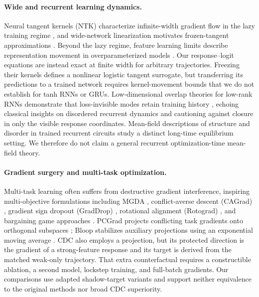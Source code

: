 \documentclass{article}
\theoremstyle{definition}
\theoremstyle{remark}
\begin{document}
\paragraph{Wide and recurrent learning dynamics.}
Neural tangent kernels (NTK) characterize infinite-width gradient flow in the lazy training regime \citep{jacot2018ntk,du2019gradient,arora2019exact,chizat2019lazy}, and wide-network linearization motivates frozen-tangent approximations \citep{lee2019wide}. Beyond the lazy regime, feature learning limits describe representation movement in overparameterized models \citep{yang2021tensor,bordelon2022learning}. Our response--logit equations are instead exact at finite width for arbitrary trajectories. Freezing their kernels defines a nonlinear logistic tangent surrogate, but transferring its predictions to a trained network requires kernel-movement bounds that we do not establish for tanh RNNs or GRUs. Low-dimensional overlap theories for low-rank RNNs demonstrate that loss-invisible modes retain training history \citep{ger2026invisible}, echoing classical insights on disordered recurrent dynamics \citep{sompolinsky1988chaos} and cautioning against closure in only the visible response coordinates. Mean-field descriptions of structure and disorder in trained recurrent circuits \citep{clark2026structure} study a distinct long-time equilibrium setting. We therefore do not claim a general recurrent optimization-time mean-field theory.

\paragraph{Gradient surgery and multi-task optimization.}
Multi-task learning often suffers from destructive gradient interference, inspiring multi-objective formulations including MGDA \citep{sener2018mgda}, conflict-averse descent (CAGrad) \citep{liu2021cagrad}, gradient sign dropout (GradDrop) \citep{chen2020graddrop}, rotational alignment (Rotograd) \citep{javaloy2022rotograd}, and bargaining game approaches \citep{navon2022nash}. PCGrad projects conflicting task gradients onto orthogonal subspaces \citep{yu2020pcgrad}; Bloop stabilizes auxiliary projections using an exponential moving average \citep{hsieh2024bloop}. CDC also employs a projection, but its protected direction is the gradient of a strong-feature response and its target is derived from the matched weak-only trajectory. That extra counterfactual requires a constructible ablation, a second model, lockstep training, and full-batch gradients. Our comparisons use adapted shadow-target variants and support neither equivalence to the original methods nor broad CDC superiority.
\end{document}
